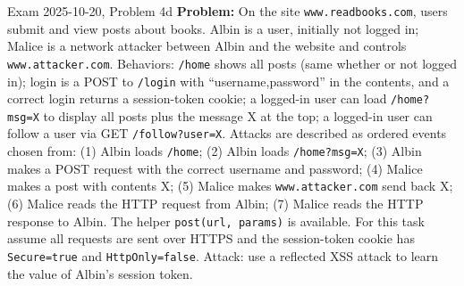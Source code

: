 \documentclass[12pt, a4paper]{article}
\begin{document}
\begin{practicebox}{Exam 2025-10-20, Problem 4d}
\textbf{Problem:} On the site \texttt{www.readbooks.com}, users submit and view posts about books. Albin is a user, initially not logged in; Malice is a network attacker between Albin and the website and controls \texttt{www.attacker.com}. Behaviors: \texttt{/home} shows all posts (same whether or not logged in); login is a POST to \texttt{/login} with ``username,password'' in the contents, and a correct login returns a session-token cookie; a logged-in user can load \texttt{/home?msg=X} to display all posts plus the message X at the top; a logged-in user can follow a user via GET \texttt{/follow?user=X}. Attacks are described as ordered events chosen from: (1) Albin loads \texttt{/home}; (2) Albin loads \texttt{/home?msg=X}; (3) Albin makes a POST request with the correct username and password; (4) Malice makes a post with contents X; (5) Malice makes \texttt{www.attacker.com} send back X; (6) Malice reads the HTTP request from Albin; (7) Malice reads the HTTP response to Albin. The helper \texttt{post(url, params)} is available. For this task assume all requests are sent over HTTPS and the session-token cookie has \texttt{Secure=true} and \texttt{HttpOnly=false}. Attack: use a reflected XSS attack to learn the value of Albin's session token.


\end{practicebox}
\end{document}
